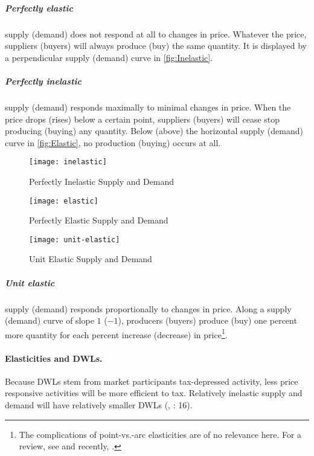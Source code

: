 
\subparagraph{Perfectly elastic} supply (demand) does not respond at all to changes in price. Whatever the price, suppliers (buyers) will always produce (buy) the same quantity. It is displayed by a perpendicular supply (demand) curve in \autoref{fig:Inelastic}.

\subparagraph{Perfectly inelastic} supply (demand) responds maximally to minimal changes in price. When the price drops (rises) below a certain point, suppliers (buyers) will cease stop producing (buying) any quantity. Below (above) the horizontal supply (demand) curve in \autoref{fig:Elastic}, no production (buying) occurs at all.

 \begin{figure}[htbp]
	\centering
	\texttt{[image: inelastic]}
	\caption{Perfectly Inelastic Supply and Demand}
	\label{fig:Inelastic}
\end{figure}

 \begin{figure}[htbp]
	\centering
	\texttt{[image: elastic]}
	\caption{Perfectly Elastic Supply and Demand}
	\label{fig:Elastic}
\end{figure}

 \begin{figure}[htbp]
	\centering
	\texttt{[image: unit-elastic]}
	\caption{Unit Elastic Supply and Demand}
	\label{fig:UnitElastic}
\end{figure}

\subparagraph{Unit elastic} supply (demand) responds proportionally to changes in price. Along a supply (demand) curve of slope $1$ ($-1$), producers (buyers) produce (buy) one percent more quantity for each percent increase (decrease) in price\footnote{The complications of point-vs.-arc elasticities are of no relevance here. For a review, see \cite{Allen1933} and recently, \cite{Vaughan1988}.}.

\paragraph{Elasticities and DWLs.} Because DWLs stem from market participants tax-depressed activity, less price responsive activities will be more efficient to tax. Relatively inelastic supply and demand will have relatively smaller DWLs (\citealt{Ramsey}, \citealt{Piatkowski2008}: 16).

